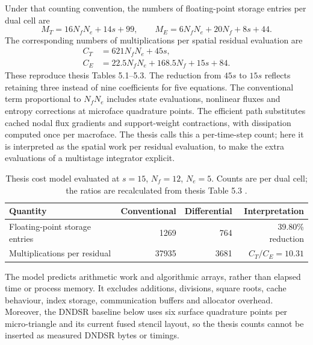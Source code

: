 \documentclass[11pt]{article}
\begin{document}
Under that counting convention, the numbers of floating-point storage entries per dual cell are
\begin{equation}
 M_T=16N_fN_e+14s+99,\qquad
 M_E=6N_fN_e+20N_f+8s+44.
 \label{eq:memory-model}
\end{equation}
The corresponding numbers of multiplications per spatial residual evaluation are
\begin{equation}
 \begin{split}
 C_T&=621N_fN_e+45s,\\
 C_E&=22.5N_fN_e+168.5N_f+15s+84.
 \end{split}
 \label{eq:operation-model}
\end{equation}
These reproduce thesis Tables 5.1--5.3.  The reduction from $45s$ to $15s$ reflects retaining three instead of nine coefficients for five equations.  The conventional term proportional to $N_fN_e$ includes state evaluations, nonlinear fluxes and entropy corrections at microface quadrature points.  The efficient path substitutes cached nodal flux gradients and support-weight contractions, with dissipation computed once per macroface.  The thesis calls this a per-time-step count; here it is interpreted as the spatial work per residual evaluation, to make the extra evaluations of a multistage integrator explicit.

\begin{table}[htbp]
\centering
\caption{Thesis cost model evaluated at $s=15$, $N_f=12$, $N_e=5$.  Counts are per dual cell; the ratios are recalculated from thesis Table 5.3 \cite{ma2026thesis}.}
\label{tab:cost-model}
\begin{tabular}{lrrr}
\toprule
Quantity & Conventional & Differential & Interpretation\\
\midrule
Floating-point storage entries & 1269 & 764 & 39.80\% reduction\\
Multiplications per residual & 37935 & 3681 & $C_T/C_E=10.31$\\
\bottomrule
\end{tabular}
\end{table}

The model predicts arithmetic work and algorithmic arrays, rather than elapsed time or process memory.  It excludes additions, divisions, square roots, cache behaviour, index storage, communication buffers and allocator overhead.  Moreover, the DNDSR baseline below uses six surface quadrature points per micro-triangle and its current fused stencil layout, so the thesis counts cannot be inserted as measured DNDSR bytes or timings.
\end{document}
